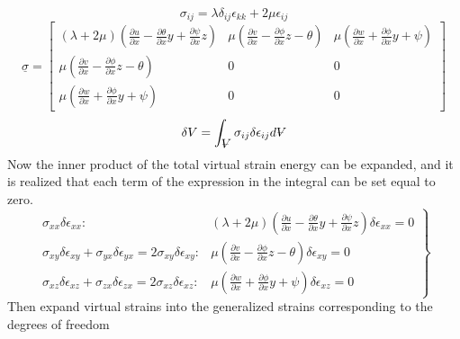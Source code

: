 \begin{equation}\label{LinearElasticStressStrainRelationship}
\sigma_{ij}=\lambda\delta_{ij}\epsilon_{kk}+2\mu\epsilon_{ij}
\end{equation}
\begin{equation}\label{StressEvaluated}
\underline{\sigma}=\left[\begin{array}{ccc}
(\lambda+2\mu)(\frac{\partial u}{\partial x}-\frac{\partial\theta}{\partial x}y+\frac{\partial\psi}{\partial x}z)&\mu(\frac{\partial v}{\partial x}-\frac{\partial\phi}{\partial x}z-\theta)&\mu(\frac{\partial w}{\partial x}+\frac{\partial\phi}{\partial x}y+\psi)\\
\mu(\frac{\partial v}{\partial x}-\frac{\partial\phi}{\partial x}z-\theta)&0&0\\
\mu(\frac{\partial w}{\partial x}+\frac{\partial\phi}{\partial x}y+\psi)&0&0
\end{array}\right]
\end{equation}
\begin{equation}\label{eq:TotalVirtualStrainEnergyExpression}
\delta V = \int_{\volume}\sigma_{ij}\delta\epsilon_{ij}d\volume
\end{equation}
Now the inner product of the total virtual strain energy can be expanded, and it is realized that each term of the expression in the integral can be set equal to zero.
\begin{equation}\label{eq:TotalVirtualStrainEnergyExpanded}
\left.\begin{array}{rc}
\sigma_{xx}\delta\epsilon_{xx}:&(\lambda+2\mu)(\frac{\partial u}{\partial x}-\frac{\partial\theta}{\partial x}y+\frac{\partial\psi}{\partial x}z)\delta\epsilon_{xx}=0\\
\sigma_{xy}\delta\epsilon_{xy}+\sigma_{yx}\delta\epsilon_{yx}=2\sigma_{xy}\delta\epsilon_{xy}:&\mu(\frac{\partial v}{\partial x}-\frac{\partial\phi}{\partial x}z-\theta)\delta\epsilon_{xy}=0\\
\sigma_{xz}\delta\epsilon_{xz}+\sigma_{zx}\delta\epsilon_{zx}=2\sigma_{xz}\delta\epsilon_{xz}:&\mu(\frac{\partial w}{\partial x}+\frac{\partial\phi}{\partial x}y+\psi)\delta\epsilon_{xz}=0
\end{array}\right\}
\end{equation}
Then expand virtual strains into the generalized strains corresponding to the degrees of freedom

